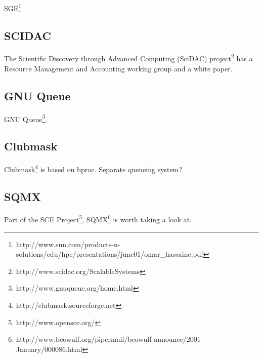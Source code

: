 SGE\footnote{http://www.sun.com/products-n-solutions/edu/hpc/presentations/june01/omar\_hassaine.pdf}


\subsection{SCIDAC}

The Scientific Discovery through Advanced Computing (SciDAC) 
project\footnote{http://www.scidac.org/ScalableSystems}
has a Resource Management and Accounting working group
and a white paper\cite{Res2000}.

\subsection{GNU Queue}

GNU Queue\footnote{http://www.gnuqueue.org/home.html}.

\subsection{Clubmask}
Clubmask\footnote{http://clubmask.sourceforge.net} is based on bproc.
Separate queueing system?

\subsection{SQMX}
Part of the SCE Project\footnote{http://www.opensce.org/}, 
SQMX\footnote{http://www.beowulf.org/pipermail/beowulf-announce/2001-January/000086.html} is worth taking a look at.
                                                                                
\newpage



